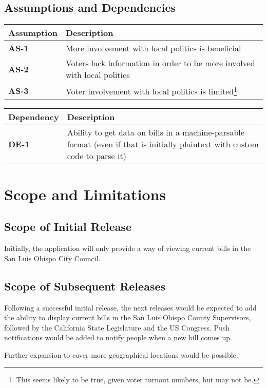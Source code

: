 \documentclass{article}
\begin{document}
\subsection{Assumptions and Dependencies}
\begin{tabu}{lX}
  \toprule
  Assumption    & Description \\
  \midrule
  \textbf{AS-1} & More involvement with local politics is beneficial \\

  \textbf{AS-2} & Voters lack information in order to be more involved
  with local politics \\
  \textbf{AS-3} & Voter involvement with local politics is
  limited\footnote{This seems likely to be true, given voter turnout
    numbers, but may not be.} \\
  \bottomrule
\end{tabu}
\vspace{.3in}
\noindent\begin{tabu}{lX}
  \toprule
  Dependency    & Description \\
  \midrule
  \textbf{DE-1} &
  Ability to get data on bills in a machine-parsable format (even if
  that is initially plaintext with custom code to parse it) \\
  \bottomrule
\end{tabu}

\section{Scope and Limitations}
\subsection{Scope of Initial Release}
Initially, the application will only provide a way of viewing current
bills in the San Luis Obispo City Council.

\subsection{Scope of Subsequent Releases}
Following a successful initial release, the next releases would be
expected to add the ability to display current bills in the San Luis
Obispo County Supervisors, followed by the California State
Legislature and the US Congress. Push notifications would be added to
notify people when a new bill comes up.

Further expansion to cover more geographical locations would be possible.
\end{document}
